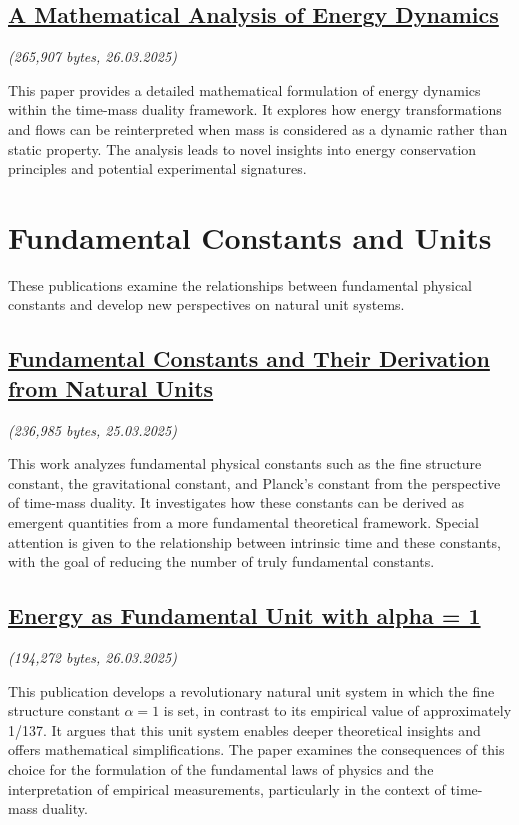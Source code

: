 \documentclass[a4paper,12pt]{article}
\newcommand{\repobase}{https://github.com/jpascher/T0-Time-Mass-Duality/tree/main/2/}
\begin{document}
	\subsection{\href{\repobase pdf/English/A Mathematical Analysis of Energy Dynamics.pdf}{A Mathematical Analysis of Energy Dynamics}}
	\textit{(265,907 bytes, 26.03.2025)}
	
	This paper provides a detailed mathematical formulation of energy dynamics within the time-mass duality framework. It explores how energy transformations and flows can be reinterpreted when mass is considered as a dynamic rather than static property. The analysis leads to novel insights into energy conservation principles and potential experimental signatures.
	
	\section{Fundamental Constants and Units}
	
	These publications examine the relationships between fundamental physical constants and develop new perspectives on natural unit systems.
	
	\subsection{\href{\repobase pdf/English/fundamental-constants-derivation.pdf}{Fundamental Constants and Their Derivation from Natural Units}}
	\textit{(236,985 bytes, 25.03.2025)}
	
	This work analyzes fundamental physical constants such as the fine structure constant, the gravitational constant, and Planck's constant from the perspective of time-mass duality. It investigates how these constants can be derived as emergent quantities from a more fundamental theoretical framework. Special attention is given to the relationship between intrinsic time and these constants, with the goal of reducing the number of truly fundamental constants.
	
	\subsection{\href{\repobase pdf/English/Energy as Fundamental Unit alpha = 1.pdf}{Energy as Fundamental Unit with alpha = 1}}
	\textit{(194,272 bytes, 26.03.2025)}
	
	This publication develops a revolutionary natural unit system in which the fine structure constant $\alpha = 1$ is set, in contrast to its empirical value of approximately 1/137. It argues that this unit system enables deeper theoretical insights and offers mathematical simplifications. The paper examines the consequences of this choice for the formulation of the fundamental laws of physics and the interpretation of empirical measurements, particularly in the context of time-mass duality.
	
\end{document}
